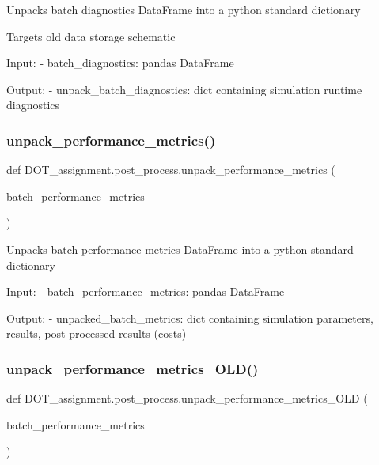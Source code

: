 \begin{DoxyVerb}Unpacks batch diagnostics DataFrame into a python standard dictionary

Targets old data storage schematic

Input:
- batch_diagnostics:                    pandas DataFrame

Output:
- unpack_batch_diagnostics:             dict containing simulation runtime diagnostics\end{DoxyVerb}
 \mbox{\label{namespace_d_o_t__assignment_1_1post__process_ae3592c2931bef399ae8fac9769a969b2}} 
\subsubsection{\texorpdfstring{unpack\_performance\_metrics()}{unpack\_performance\_metrics()}}
{\footnotesize\ttfamily def D\+O\+T\+\_\+assignment.\+post\+\_\+process.\+unpack\+\_\+performance\+\_\+metrics (\begin{DoxyParamCaption}\item[{}]{batch\+\_\+performance\+\_\+metrics }\end{DoxyParamCaption})}

\begin{DoxyVerb}Unpacks batch performance metrics DataFrame into a python standard dictionary

Input:
- batch_performance_metrics:           pandas DataFrame

Output:
- unpacked_batch_metrics:              dict containing simulation parameters, results, post-processed results (costs)\end{DoxyVerb}
 \mbox{\label{namespace_d_o_t__assignment_1_1post__process_a3ba1908baefc660e00475ade1e05011c}} 
\subsubsection{\texorpdfstring{unpack\_performance\_metrics\_OLD()}{unpack\_performance\_metrics\_OLD()}}
{\footnotesize\ttfamily def D\+O\+T\+\_\+assignment.\+post\+\_\+process.\+unpack\+\_\+performance\+\_\+metrics\+\_\+\+O\+LD (\begin{DoxyParamCaption}\item[{}]{batch\+\_\+performance\+\_\+metrics }\end{DoxyParamCaption})}

